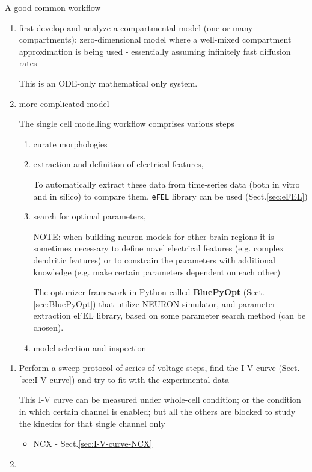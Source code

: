 A good common workflow
\begin{enumerate}
  
  \item  first develop and analyze a compartmental model (one or many
  compartments): zero-dimensional model where a well-mixed compartment
  approximation is being used - essentially assuming infinitely fast diffusion
  rates

This is an ODE-only mathematical only system.


  \item more complicated model
  
The single cell modelling workflow comprises various steps
\begin{enumerate}
  \item curate morphologies
  
  \item  extraction   and   definition   of   electrical   features,   
  
 To automatically extract these data from time-series data (both in vitro and
 in silico) to compare them, \verb!eFEL! library can be used
 (Sect.\ref{sec:eFEL})
  
  \item search   for   optimal parameters,
  
NOTE:    when building neuron models for other brain  regions it  is sometimes
necessary to define novel electrical features (e.g. complex dendritic features)
or to constrain the parameters with additional knowledge (e.g. make        
certain parameters dependent on each other)

The optimizer framework in Python called {\bf BluePyOpt}
(Sect.\ref{sec:BluePyOpt}) that utilize NEURON simulator, and parameter
extraction eFEL library, based on some parameter search method (can be chosen).


  \item model  selection  and  inspection
\end{enumerate}

\end{enumerate}

\begin{enumerate}
  \item Perform a sweep protocol of series of voltage steps, find the I-V curve
  (Sect.\ref{sec:I-V-curve}) and try to fit with the experimental data
  
This I-V curve can be measured under whole-cell condition; or the condition in
which certain channel is enabled; but all the others are blocked to study the
kinetics for that single channel only
\begin{itemize}
  \item NCX - Sect.\ref{sec:I-V-curve-NCX}
  
\end{itemize}
  
  \item 
\end{enumerate}


